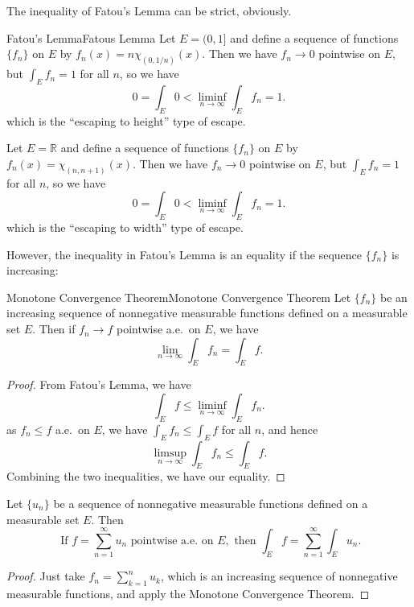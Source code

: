 \documentclass[../main.tex]{subfiles}
\begin{document}
The inequality of Fatou's Lemma can be strict, obviously.
\begin{example}{Fatou's Lemma}{Fatous Lemma}
	Let $E = (0,1]$ and define a sequence of functions $\{ f_n \}$ on $E$ by $f_n(x) = n \chi_{(0, 1/n)}(x)$. Then we have $f_n \to 0$ pointwise on $E$, but $\int_E f_n = 1$ for all $n$, so we have
	\begin{equation*}
		0 = \int_E 0 < \liminf_{n \to \infty} \int_E f_n = 1.
	\end{equation*}
	which is the ``escaping to height'' type of escape.

	Let $E = \mathbb{R}$ and define a sequence of functions $\{ f_n \}$ on $E$ by $f_n(x) = \chi_{(n, n+1)}(x)$. Then we have $f_n \to 0$ pointwise on $E$, but $\int_E f_n = 1$ for all $n$, so we have
	\begin{equation*}
		0 = \int_E 0 < \liminf_{n \to \infty} \int_E f_n = 1.
	\end{equation*}
	which is the ``escaping to width'' type of escape.
\end{example}

However, the inequality in Fatou's Lemma is an equality if the sequence $\{ f_n \}$ is increasing:

\begin{theorem}{Monotone Convergence Theorem}{Monotone Convergence Theorem}
	Let $\{ f_n \}$ be an increasing sequence of nonnegative measurable functions defined on a measurable set $E$. Then if $f_n \to f$ pointwise a.e.\ on $E$, we have
	\begin{equation}
		\lim_{n \to \infty} \int_E f_n = \int_E f.
	\end{equation}
\end{theorem}
\begin{proof}
	From Fatou's Lemma, we have
	\begin{equation*}
		\int_E f \leq \liminf_{n \to \infty} \int_E f_n.
	\end{equation*}
	as $f_n \leq f$ a.e.\ on $E$, we have $\int_E f_n \leq \int_E f$ for all $n$, and hence
	\begin{equation*}
		\limsup_{n \to \infty} \int_E f_n \leq \int_E f.
	\end{equation*}
	Combining the two inequalities, we have our equality.
\end{proof}

\begin{corollary}{}{}
	Let $\{ u_n \}$ be a sequence of nonnegative measurable functions defined on a measurable set $E$. Then
	\begin{equation}
		\text{ If } f = \sum_{n=1}^{\infty} u_n \text{ pointwise a.e.\ on } E, \text{ then } \int_E f = \sum_{n=1}^{\infty} \int_E u_n.
	\end{equation}
\end{corollary}
\begin{proof}
	Just take $f_n = \sum_{k=1}^{n} u_k$, which is an increasing sequence of nonnegative measurable functions, and apply the Monotone Convergence Theorem.
\end{proof}
\end{document}

